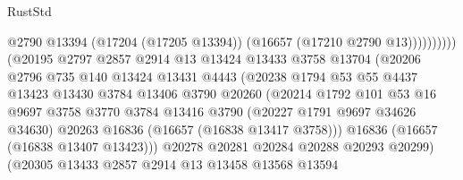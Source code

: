 \begin{lexlean}{RustStd}
\begin{coremodule}
                                            @2790
                                            @13394
                                            (@17204 (@17205 @13394))
                                            (@16657 (@17210 @2790 @13))))))))))
                            (@20195
                              @2797
                              @2857
                              @2914
                              @13
                              @13424
                              @13433
                              @3758
                              @13704
                              (@20206
                                @2796
                                @735
                                @140
                                @13424
                                @13431
                                @4443
                                (@20238
                                  @1794
                                  @53
                                  @55
                                  @4437
                                  @13423
                                  @13430
                                  @3784
                                  @13406
                                  @3790
                                  @20260
                                  (@20214
                                    @1792
                                    @101
                                    @53
                                    @16
                                    @9697
                                    @3758
                                    @3770
                                    @3784
                                    @13416
                                    @3790
                                    (@20227 @1791 @9697 @34626 @34630)
                                    @20263
                                    @16836
                                    (@16657 (@16838 @13417 @3758)))
                                  @16836
                                  (@16657 (@16838 @13407 @13423)))
                                @20278
                                @20281
                                @20284
                                @20288
                                @20293
                                @20299)
                              (@20305
                                @13433
                                @2857
                                @2914
                                @13
                                @13458
                                @13568
                                @13594

\end{coremodule}
\end{lexlean}
